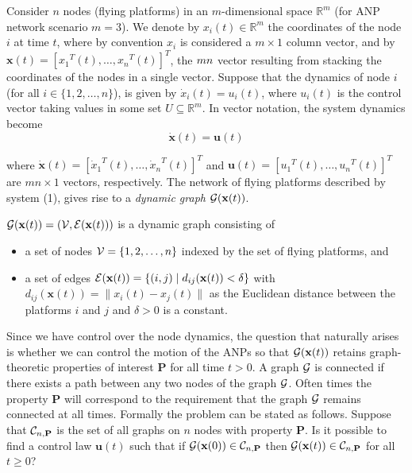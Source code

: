 \documentclass[10pt]{IEEEtran}
\begin{document}
Consider $n$ nodes (flying platforms) in an $m$-dimensional space ${\mathbb{R}}^m$ (for ANP network scenario $m = 3$). We denote by $x_i(t) \in {\mathbb{R}}^m$ the coordinates of the node $i$ at time $t$, where by convention $x_i$ is considered a $m \times 1$ column vector, and by $\mathbf{x}(t) = {[{x_1}^T(t), \ldots, {x_n}^T(t)]}^T$, the $mn \time 1$ vector resulting from stacking the coordinates of the
nodes in a single vector. Suppose that the dynamics of node $i$ (for all $i \in \{1, 2, \ldots, n\}$), is given by $\dot{x}_i(t) = u_i(t)$, where $u_i(t)$ is the control vector taking values in some set $U \subseteq {\mathbb{R}}^m$. In vector notation, the system dynamics become
\begin{equation}
\mathbf{\dot{x}}(t) = {\mathbf{u}}(t)
\end{equation}

where ${\mathbf{\dot{x}}}(t) = [{\dot{x}_1}^T(t), \ldots, {\dot{x}_n}^T(t)]^T$ and $\mathbf{u}(t) = [{u_1}^T(t), \ldots, {u_n}^T(t)]^T$ are $mn \times 1$ vectors, respectively. The network of flying platforms described by system (1), gives rise to a {\em dynamic graph} ${\cal G}(\mathbf{x}(t))$.

${\cal G}(\mathbf{x}(t)) = ({\cal V}, {\cal E}({\mathbf{x}}(t)))$ is a dynamic graph consisting of

\begin{itemize}
\item a set of nodes ${\cal V} = \{1, 2, \ldots, n\}$ indexed by the set of flying platforms, and\vspace{-0.0in}
\item a set of edges ${\cal E} (\mathbf{x}(t)) = \{(i, j) \mid d_{ij} (\mathbf{x}(t)) < \delta\}$ with $d_{ij}(\mathbf{x}(t)) = \parallel{x_i(t) - x_j(t)}\parallel$ as the Euclidean distance between the platforms $i$ and $j$ and $\delta >0$ is a constant.
\end{itemize}

Since we have control over the node dynamics, the question that naturally arises is whether we can control the motion of the ANPs so that ${\cal G}(\mathbf{x}(t))$ retains graph-theoretic properties of interest $\mathbf{P}$ for all time $t > 0$. A graph $\cal G$ is connected if there exists a path between any two nodes of the graph $\cal G$. Often times the property $\mathbf{P}$ will correspond to the requirement that the graph $\cal G$ remains connected at all times.  Formally the problem can be stated as follows. Suppose that ${\cal C}_{n,\mathbf{P}}$ is the set of all graphs on $n$ nodes with property $\mathbf{P}$. Is it possible to find a control law $\mathbf{u}(t)$ such that if ${\cal G}(\mathbf{x}(0)) \in {\cal C}_{n,\mathbf{P}}$ then ${\cal G}(\mathbf{x}(t)) \in {\cal C}_{n,\mathbf{P}}$ for all $t \geq 0$?
\end{document}
